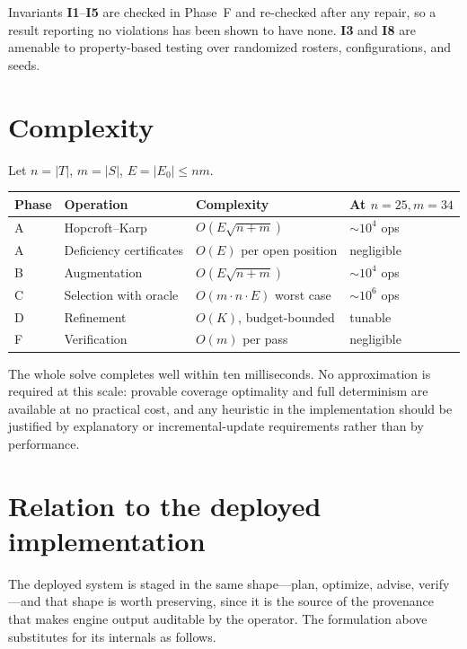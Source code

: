 \documentclass[11pt,a4paper]{article}
\theoremstyle{definition}
\theoremstyle{remark}
\begin{document}
Invariants \textbf{I1}--\textbf{I5} are checked in Phase~F and re-checked
after any repair, so a result reporting no violations has been shown to have
none. \textbf{I3} and \textbf{I8} are amenable to property-based testing over
randomized rosters, configurations, and seeds.

\section{Complexity}

Let $n = \lvert T \rvert$, $m = \lvert S \rvert$, $E = \lvert E_0 \rvert
\leq nm$.

\begin{center}
\begin{tabular}{@{}llll@{}}
\toprule
Phase & Operation & Complexity & At $n{=}25, m{=}34$ \\
\midrule
A & Hopcroft--Karp & $O(E\sqrt{n+m})$ & ${\sim}10^{4}$ ops \\
A & Deficiency certificates & $O(E)$ per open position & negligible \\
B & Augmentation & $O(E\sqrt{n+m})$ & ${\sim}10^{4}$ ops \\
C & Selection with oracle & $O(m \cdot n \cdot E)$ worst case &
    ${\sim}10^{6}$ ops \\
D & Refinement & $O(K)$, budget-bounded & tunable \\
F & Verification & $O(m)$ per pass & negligible \\
\bottomrule
\end{tabular}
\end{center}

The whole solve completes well within ten milliseconds. No approximation is
required at this scale: provable coverage optimality and full determinism
are available at no practical cost, and any heuristic in the implementation
should be justified by explanatory or incremental-update requirements rather
than by performance.

\section{Relation to the deployed implementation}

The deployed system is staged in the same shape---plan, optimize, advise,
verify---and that shape is worth preserving, since it is the source of the
provenance that makes engine output auditable by the operator. The
formulation above substitutes for its internals as follows.
\end{document}
